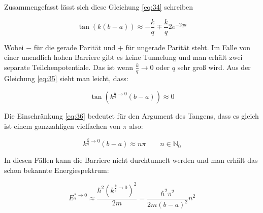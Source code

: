 Zusammengefasst lässt sich diese Gleichung \eqref{eq:34} schreiben

\begin{equation}
  \label{eq:35}
  \tan(k(b-a)) \approx - \frac{k}{q} \mp \frac{k}{q} 2e^{-2qa}
\end{equation}

Wobei \(-\) für die gerade Parität und \(+\) für ungerade Parität steht. Im Falle von einer unendlich hohen Barriere gibt es keine Tunnelung und man erhält zwei separate Teilchenpotentiale. Das ist wenn \(\frac{k}{q}\to 0\) oder \(q\) sehr groß wird. Aus der Gleichung \eqref{eq:35} sieht man leicht, dass:


\begin{equation}
  \label{eq:36}
  \tan(k^{\frac{k}{q}\to 0 }(b-a)) \approx 0
\end{equation}

Die Einschränkung \eqref{eq:36} bedeutet für den Argument des Tangens, dass es gleich ist einem ganzzahligen vielfachen von \(\pi\) also:

\begin{equation}
  \label{eq:37}
  k^{\frac{k}{q}\to 0 }(b-a) \approx n\pi \qquad n\in \mathbb N_0
\end{equation}

In diesen Fällen kann die Barriere nicht durchtunnelt werden und man erhält das schon bekannte Energiespektrum:

\begin{equation}
  \label{eq:38}
  E^{\frac{k}{q}\to 0 } \approx \frac{ \hbar^2 (k^{\frac{k}{q}\to 0 })^2}{2m } = \frac{ \hbar^2\pi^2 }{2m(b-a)^2 }n^2
\end{equation}



